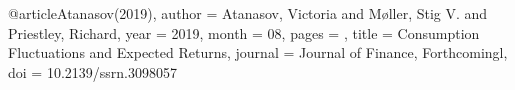@article{Atanasov(2019),
author = {Atanasov, Victoria and Møller, Stig V. and Priestley, Richard},
year = {2019},
month = {08},
pages = {},
title = {Consumption Fluctuations and Expected Returns},
journal = {Journal of Finance, Forthcomingl},
doi = {10.2139/ssrn.3098057}
}